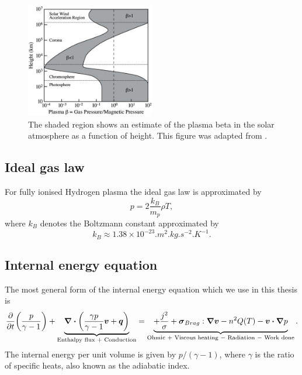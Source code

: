 \begin{figure}
    \centering
    \includegraphics[width = 0.5\textwidth]{figures/introduction/plasma_beta.jpg}
    \caption{The shaded region shows an estimate of the plasma beta in the solar atmosphere as a function of height. This figure was adapted from \citet{Gary2001}.}
    \label{fig:plasma_beta}
\end{figure}

\subsection{Ideal gas law}

For fully ionised Hydrogen plasma the ideal gas law is approximated by
\begin{equation}
    \label{eq:ideal_gas_law}
    p=2\frac{k_B}{m_p}\rho T,
\end{equation}
where $k_B$ denotes the Boltzmann constant approximated by 
\[k_B\approx1.38 \times 10^{-23}\si{.m^2.kg.s^{-2}.K^{-1}}.\]

\subsection{Internal energy equation}
\label{sec:internal_energy_equation}

The most general form of the internal energy equation which we use in this thesis is
\begin{equation}
    \label{eq:internal_energy}
    \pdv{}{t}\qty(\frac{p}{\gamma - 1})+\underbrace{\div(\frac{\gamma p}{\gamma - 1}\vec{v}+\vec{q})}_{\text{Enthalpy flux + Conduction}}=\underbrace{ + \frac{j^2}{\sigma}+\vec{\sigma}_{Brag}:\grad \vec{v}-n^2Q(T)-\vec{v}\vdot\grad{p}}_{\text{Ohmic + Viscous heating $-$ Radiation $-$ Work done}}.
\end{equation}
The internal energy per unit volume is given by $p/(\gamma - 1)$, where $\gamma$ is the ratio of specific heats, also known as the adiabatic index.

